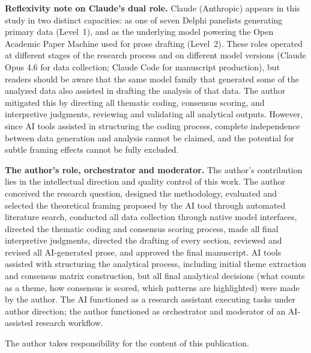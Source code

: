 \documentclass[preprint,review,12pt]{elsarticle}
\begin{document}
\textbf{Reflexivity note on Claude's dual role.} Claude (Anthropic) appears in this study in two distinct capacities: as one of seven Delphi panelists generating primary data (Level~1), and as the underlying model powering the Open Academic Paper Machine used for prose drafting (Level~2). These roles operated at different stages of the research process and on different model versions (Claude Opus 4.6 for data collection; Claude Code for manuscript production), but readers should be aware that the same model family that generated some of the analyzed data also assisted in drafting the analysis of that data. The author mitigated this by directing all thematic coding, consensus scoring, and interpretive judgments, reviewing and validating all analytical outputs. However, since AI tools assisted in structuring the coding process, complete independence between data generation and analysis cannot be claimed, and the potential for subtle framing effects cannot be fully excluded.

\textbf{The author's role, orchestrator and moderator.} The author's contribution lies in the intellectual direction and quality control of this work. The author conceived the research question, designed the methodology, evaluated and selected the theoretical framing proposed by the AI tool through automated literature search, conducted all data collection through native model interfaces, directed the thematic coding and consensus scoring process, made all final interpretive judgments, directed the drafting of every section, reviewed and revised all AI-generated prose, and approved the final manuscript. AI tools assisted with structuring the analytical process, including initial theme extraction and consensus matrix construction, but all final analytical decisions (what counts as a theme, how consensus is scored, which patterns are highlighted) were made by the author. The AI functioned as a research assistant executing tasks under author direction; the author functioned as orchestrator and moderator of an AI-assisted research workflow.

The author takes responsibility for the content of this publication.


\iffalse

\appendix
\end{document}
